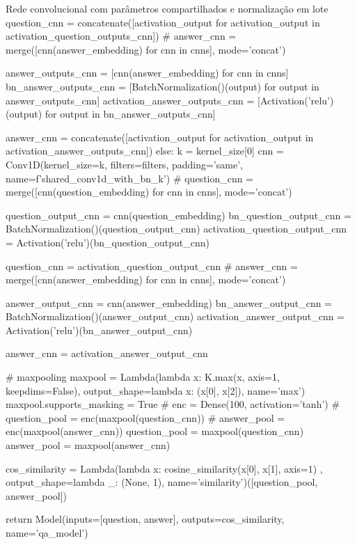 \begin{mypython-linenumber}{Rede convolucional com parâmetros compartilhados e normalização em lote}
            question_cnn = concatenate([activation_output for activation_output in activation_question_outputs_cnn])
            # answer_cnn = merge([cnn(answer_embedding) for cnn in cnns], mode='concat')

            answer_outputs_cnn = [cnn(answer_embedding) for cnn in cnns]
            bn_answer_outputs_cnn = [BatchNormalization()(output) for output in answer_outputs_cnn]
            activation_answer_outputs_cnn = [Activation('relu')(output) for output in bn_answer_outputs_cnn]

            answer_cnn = concatenate([activation_output for activation_output in activation_answer_outputs_cnn])
        else:
            k = kernel_size[0]
            cnn = Conv1D(kernel_size=k,
                           filters=filters,
                           padding='same',
                           name=f'shared_conv1d_with_bn_{k}')
            # question_cnn = merge([cnn(question_embedding) for cnn in cnns], mode='concat')

            question_output_cnn = cnn(question_embedding)
            bn_question_output_cnn = BatchNormalization()(question_output_cnn)
            activation_question_output_cnn = Activation('relu')(bn_question_output_cnn)

            question_cnn = activation_question_output_cnn
            # answer_cnn = merge([cnn(answer_embedding) for cnn in cnns], mode='concat')

            answer_output_cnn = cnn(answer_embedding)
            bn_answer_output_cnn = BatchNormalization()(answer_output_cnn)
            activation_answer_output_cnn = Activation('relu')(bn_answer_output_cnn)

            answer_cnn = activation_answer_output_cnn

        # maxpooling
        maxpool = Lambda(lambda x: K.max(x, axis=1, keepdims=False), output_shape=lambda x: (x[0], x[2]),
                         name='max')
        maxpool.supports_masking = True
        # enc = Dense(100, activation='tanh')
        # question_pool = enc(maxpool(question_cnn))
        # answer_pool = enc(maxpool(answer_cnn))
        question_pool = maxpool(question_cnn)
        answer_pool = maxpool(answer_cnn)

        cos_similarity = Lambda(lambda x: cosine_similarity(x[0], x[1], axis=1)
                                       , output_shape=lambda _: (None, 1), name='similarity')([question_pool,
                                                                                               answer_pool])

        

        return Model(inputs=[question, answer], outputs=cos_similarity,
                                   name='qa_model')
\end{mypython-linenumber}

